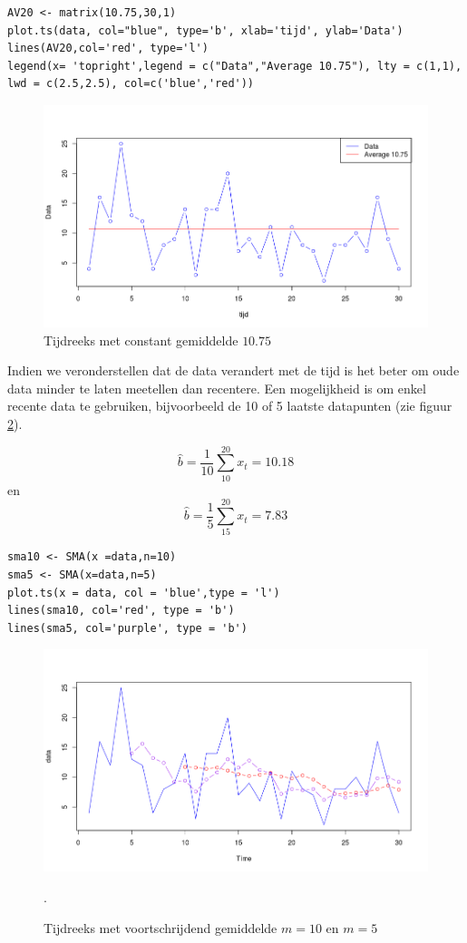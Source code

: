 \begin{lstlisting}
AV20 <- matrix(10.75,30,1)
plot.ts(data, col="blue", type='b', xlab='tijd', ylab='Data')
lines(AV20,col='red', type='l')
legend(x= 'topright',legend = c("Data","Average 10.75"), lty = c(1,1), lwd = c(2.5,2.5), col=c('blue','red'))
\end{lstlisting}

\begin{figure}
	\centering
		\includegraphics[width=1.00\textwidth]{images/tijdreeksen/tijdreeks20.png}
	\caption{Tijdreeks met constant gemiddelde $10.75$}
	\label{fig:tijdreeks21}
\end{figure}

Indien we veronderstellen dat de data verandert met de tijd is het beter om oude data minder te laten meetellen dan recentere. Een mogelijkheid is om enkel recente data te gebruiken, bijvoorbeeld de 10 of 5 laatste datapunten (zie figuur \ref{fig:tijdreeks31}).

\[ \widehat{b} = \frac{1}{10} \sum_{10}^{20} x_{t} = 10.18 \] en
\[ \widehat{b} = \frac{1}{5} \sum_{15}^{20} x_{t} = 7.83 \]

\begin{lstlisting}
sma10 <- SMA(x =data,n=10)
sma5 <- SMA(x=data,n=5)
plot.ts(x = data, col = 'blue',type = 'l')
lines(sma10, col='red', type = 'b')
lines(sma5, col='purple', type = 'b')
\end{lstlisting}

\begin{figure}
\centering
	\includegraphics[width=1.00\textwidth]{images/tijdreeksen/tijdreekssma.png}
	\caption{Tijdreeks met voortschrijdend gemiddelde $m = 10$ en $m=5$}. 
\label{fig:tijdreeks31}
\end{figure}

